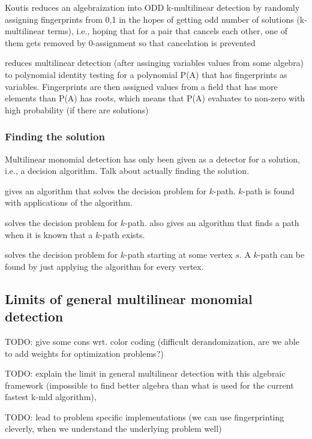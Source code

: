 Koutis reduces an algebraization into ODD k-multilinear detection by randomly assigning fingerprints from {0,1} in the hopes 
of getting odd number of solutions (k-multilinear terms), 
i.e., hoping that for a pair that cancels each other, one of them gets removed by 0-assignment so that cancelation is prevented

\cite{Williams09} reduces multilinear detection (after assinging variables values from some algebra) 
to polynomial identity testing for a polynomial P(A) that has fingerprints as variables. 
Fingerprints are then assigned values from a field that has more elements than P(A) has roots, which 
means that P(A) evaluates to non-zero with high probability (if there are solutions)



\subsubsection{Finding the solution}

Multilinear monomial detection has only been given as a detector for a solution, i.e., a decision algorithm. 
Talk about actually finding the solution.

\cite{Koutis08} gives an algorithm that solves the decision problem for $k$-path. 
$k$-path is found with  applications of the algorithm.

\cite{Williams09} solves the decision problem for $k$-path. \cite{Williams09} also gives an algorithm 
that finds a path when it is known that a $k$-path exists.

\cite{Björklund17} solves the decision problem for $k$-path starting at some vertex $s$. 
A $k$-path can be found by just applying the algorithm for every vertex.

\subsection{Limits of general multilinear monomial detection}

TODO: give some cons wrt. color coding (difficult derandomization, 
are we able to add weights for optimization problems?) %

TODO: explain the limit in general multilinear detection with this algebraic framework 
(impossible to find better algebra than what is used for the current fastest k-mld algorithm), \cite{KouWil09}

TODO: lead to problem specific implementations 
(we can use fingerprinting cleverly, when we understand the underlying problem well)


